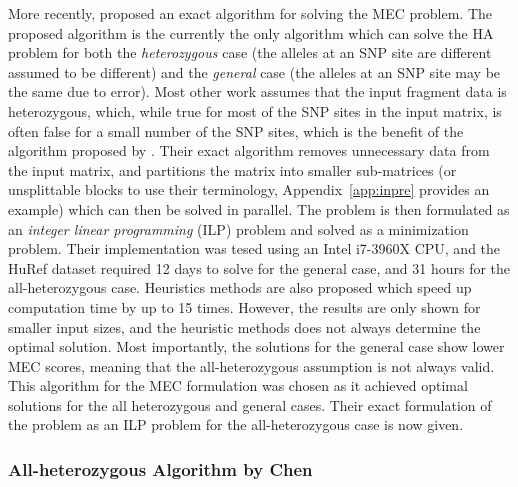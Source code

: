 \documentclass[10pt,twocolumn]{article}
\begin{document}
More recently, \cite{chen:2013} proposed an exact algorithm for solving the MEC problem. The proposed
algorithm is the currently the only algorithm which can solve the HA problem for both the \textit{heterozygous}
case (the alleles at an SNP site are different assumed to be different) and the \textit{general} case (the 
alleles at an SNP site may be the same due to error). Most other work assumes that the input fragment data is 
heterozygous, which, while true for most of the SNP sites in the input matrix, is often false for a small 
number of the SNP sites, which is the benefit of the algorithm proposed by \cite{chen:2013}. Their exact
algorithm removes unnecessary data from the input matrix, and partitions the matrix into smaller sub-matrices
(or unsplittable blocks to use their terminology, Appendix~\ref{app:inpre} provides an example) which can then 
be solved in parallel. The problem is then formulated as an \textit{integer linear programming} (ILP) problem 
and solved as a minimization problem. Their implementation was tesed using an Intel i7-3960X CPU, and the 
HuRef dataset required 12 days to solve for the general case, and 31 hours for the all-heterozygous case. 
Heuristics methods are also proposed which speed up computation time by up to 15 times. However, the results 
are only shown for smaller input sizes, and the heuristic methods does  not always determine the optimal 
solution. Most importantly, the solutions for the general case show lower MEC scores, meaning that the 
all-heterozygous assumption is not always valid. This algorithm for the MEC formulation was chosen as it
achieved optimal solutions for the all heterozygous and general cases. Their exact formulation of the problem
as an ILP problem for the all-heterozygous case is now given.

\subsubsection{All-heterozygous Algorithm by Chen} \label{sec:allhetro}
\end{document}
